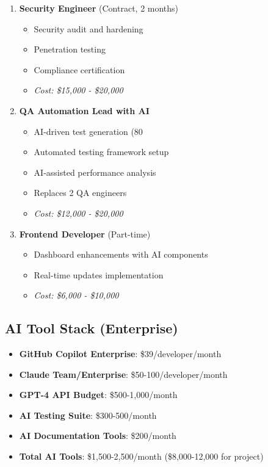 \documentclass[12pt,a4paper]{report}
\begin{document}
\begin{enumerate}
    \item \textbf{Security Engineer} (Contract, 2 months)
    \begin{itemize}
        \item Security audit and hardening
        \item Penetration testing
        \item Compliance certification
        \item \textit{Cost: \$15,000 - \$20,000}
    \end{itemize}
    
    \item \textbf{QA Automation Lead with AI}
    \begin{itemize}
        \item AI-driven test generation (80%
        \item Automated testing framework setup
        \item AI-assisted performance analysis
        \item Replaces 2 QA engineers
        \item \textit{Cost: \$12,000 - \$20,000}
    \end{itemize}
    
    \item \textbf{Frontend Developer} (Part-time)
    \begin{itemize}
        \item Dashboard enhancements with AI components
        \item Real-time updates implementation
        \item \textit{Cost: \$6,000 - \$10,000}
    \end{itemize}
\end{enumerate}

\subsection{AI Tool Stack (Enterprise)}
\begin{itemize}
    \item \textbf{GitHub Copilot Enterprise}: \$39/developer/month
    \item \textbf{Claude Team/Enterprise}: \$50-100/developer/month
    \item \textbf{GPT-4 API Budget}: \$500-1,000/month
    \item \textbf{AI Testing Suite}: \$300-500/month
    \item \textbf{AI Documentation Tools}: \$200/month
    \item \textbf{Total AI Tools}: \$1,500-2,500/month (\$8,000-12,000 for project)
\end{itemize}
\end{document}

